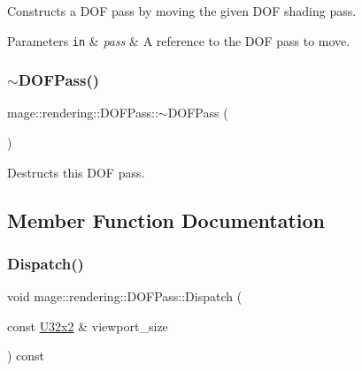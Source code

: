 Constructs a D\+OF pass by moving the given D\+OF shading pass.


\begin{DoxyParams}[1]{Parameters}
\mbox{\tt in}  & {\em pass} & A reference to the D\+OF pass to move. \\
\hline
\end{DoxyParams}
\hypertarget{classmage_1_1rendering_1_1_d_o_f_pass_a3009125880a1546657d2f57179299e3b}{}\label{classmage_1_1rendering_1_1_d_o_f_pass_a3009125880a1546657d2f57179299e3b} 
\subsubsection{\texorpdfstring{$\sim$\+D\+O\+F\+Pass()}{~DOFPass()}}
{\footnotesize\ttfamily mage\+::rendering\+::\+D\+O\+F\+Pass\+::$\sim$\+D\+O\+F\+Pass (\begin{DoxyParamCaption}{ }\end{DoxyParamCaption})\hspace{0.3cm}{\ttfamily [default]}}

Destructs this D\+OF pass. 

\subsection{Member Function Documentation}
\hypertarget{classmage_1_1rendering_1_1_d_o_f_pass_a60d839bbeb81e12778ef96468954951a}{}\label{classmage_1_1rendering_1_1_d_o_f_pass_a60d839bbeb81e12778ef96468954951a} 
\subsubsection{\texorpdfstring{Dispatch()}{Dispatch()}}
{\footnotesize\ttfamily void mage\+::rendering\+::\+D\+O\+F\+Pass\+::\+Dispatch (\begin{DoxyParamCaption}\item[{const \hyperlink{namespacemage_a88e05bff0300120c013285d3dcad95c5}{U32x2} \&}]{viewport\+\_\+size }\end{DoxyParamCaption}) const\hspace{0.3cm}{\ttfamily [noexcept]}}

